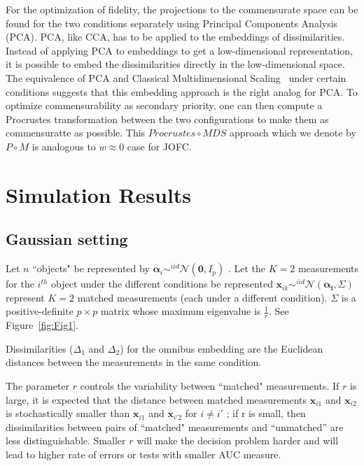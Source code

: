 \documentclass[11pt]{article} %
\begin{document}
 For the optimization of fidelity, the projections to the commensurate space can be found for the two conditions separately  using Principal Components Analysis (PCA).  PCA, like CCA, has to be applied to the embeddings of dissimilarities. Instead of applying PCA to embeddings to get a low-dimensional representation, it is possible to   embed the dissimilarities directly in the low-dimensional space. The equivalence of PCA and Classical Multidimensional Scaling~\cite{CMDS} under certain conditions suggests that this embedding approach is the right analog for PCA. To optimize commensurability as secondary priority, one can then  compute a Procrustes transformation between the two configurations to make them as commensuratte as possible.
  This $Procrustes \circ MDS$  approach  which we denote by  $P\circ M$ is  analogous to $w\approx 0$ case for JOFC. 




\section{Simulation Results\label{sec:Simulation Results}}
\subsection{Gaussian setting\label{subsec:GaussianSet}}

  Let $n$ ``objects" be represented  by  $\bm{\alpha}_i \sim^{iid} \mathcal{N}(\bm{0},I_p)$ .  Let the $K=2$ measurements for the $i^{th}$ object under the different conditions be represented  $\bm{x}_{ik}  \sim^{iid} \mathcal{N}(\bm{\alpha_i},\Sigma)$ represent $K=2$ matched measurements (each under a different condition).
  $\Sigma$ is a positive-definite $p\times p$ matrix whose maximum eigenvalue is   $\frac{1}{r} $. See Figure~\ref{fig:Fig1}.
  
 Dissimilarities ($\Delta_1$ and  $\Delta_2$) for the omnibus embedding are the Euclidean distances between the measurements in the same condition.
 
The parameter $r$ controls the variability between ``matched" measurements. If $r$ is large, it is expected that the distance between matched measurements
$\bm{x}_{i1}$ and $\bm{x}_{i2}$ is stochastically smaller than $\bm{x}_{i1}$ and $\bm{x}_{i'2}$ for $i \neq i'$ ; if r is small, then dissimilarities  between pairs of ``matched"  measurements and 
``unmatched'' are less distinguishable. Smaller $r$ will make the decision problem harder and will lead to higher rate of errors or tests with smaller AUC measure.
\end{document}
